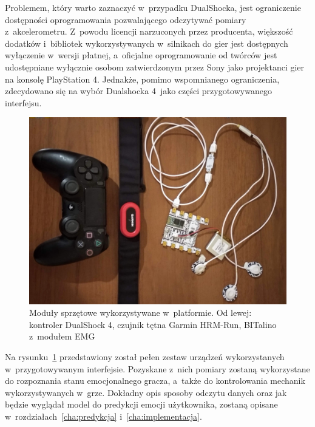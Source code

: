 Problemem, który warto zaznaczyć w~przypadku DualShocka, jest ograniczenie dostępności oprogramowania pozwalającego odczytywać pomiary z~akcelerometru. Z~powodu licencji narzuconych przez producenta, większość dodatków i~bibliotek wykorzystywanych w~silnikach do gier jest dostępnych wyłączenie w~wersji płatnej, a~oficjalne oprogramowanie od twórców jest udostępniane wyłącznie osobom zatwierdzonym przez Sony jako projektanci gier na konsolę PlayStation 4. Jednakże, pomimo wspomnianego ograniczenia, zdecydowano się na wybór Dualshocka 4~jako części przygotowywanego interfejsu.

\begin{figure}
	\centering
	\includegraphics[width=0.7\linewidth]{images/hardware.jpg}
	\caption{Moduły sprzętowe wykorzystywane w~platformie. Od lewej: kontroler DualShock 4, czujnik tętna Garmin HRM-Run, BITalino z~modułem EMG}
	\label{fig:hardware}
\end{figure}

Na rysunku~\ref{fig:hardware} przedstawiony został pełen zestaw urządzeń wykorzystanych w~przygotowywanym interfejsie. Pozyskane z~nich pomiary zostaną wykorzystane do rozpoznania stanu emocjonalnego gracza, a~także do kontrolowania mechanik wykorzystywanych w~grze. Dokładny opis sposoby odczytu danych oraz jak będzie wyglądał model do predykcji emocji użytkownika, zostaną opisane w~rozdziałach~\ref{cha:predykcja} i~\ref{cha:implementacja}.